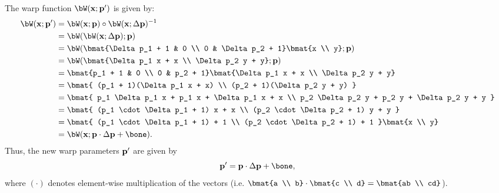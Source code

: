 \begin{problem}
\begin{enumroman}
    \begin{answer}
      The warp function $\bW(\bx; \bp')$ is given by:
      \begin{align*}
        \bW(\bx; \bp') &= \bW(\bx; \bp) \circ \bW(\bx; \Delta \bp)^{-1} \\
        &= \bW(\bW(\bx; \Delta \bp); \bp) \\
        &= \bW(\bmat{\Delta p_1 + 1 & 0 \\ 0 & \Delta p_2 + 1} \bmat{x \\ y}; \bp) \\
        &= \bW(\bmat{\Delta p_1 x + x \\ \Delta p_2 y + y}; \bp) \\
        &= \bmat{p_1 + 1 & 0 \\ 0 & p_2 + 1} \bmat{\Delta p_1 x + x \\ \Delta p_2 y + y} \\
        &= \bmat{
          (p_1 + 1)(\Delta p_1 x + x) \\
          (p_2 + 1)(\Delta p_2 y + y)
        } \\
        &= \bmat{
          p_1 \Delta p_1 x + p_1 x + \Delta p_1 x + x \\
          p_2 \Delta p_2 y + p_2 y + \Delta p_2 y + y
        } \\
        &= \bmat{
          (p_1 \cdot \Delta p_1 + 1) x + x \\
          (p_2 \cdot \Delta p_2 + 1) y + y
        } \\
        &= \bmat{
          (p_1 \cdot \Delta p_1 + 1) + 1 \\
          (p_2 \cdot \Delta p_2 + 1) + 1
        } \bmat{x \\ y} \\
        &= \bW(\bx; \bp \cdot \Delta \bp + \bone).
      \end{align*}
      Thus, the new warp parameters $\mathbf{p}'$ are given by
      \begin{equation}
        \bp' = \bp \cdot \Delta \bp + \bone,
        \label{eq:ans:2.4}
      \end{equation}
      where $(\cdot)$ denotes element-wise multiplication of the vectors
      (i.e. $\bmat{a \\ b} \cdot \bmat{c \\ d} = \bmat{ab \\ cd}$). 
    \end{answer}
  \end{enumroman}
\end{problem}

